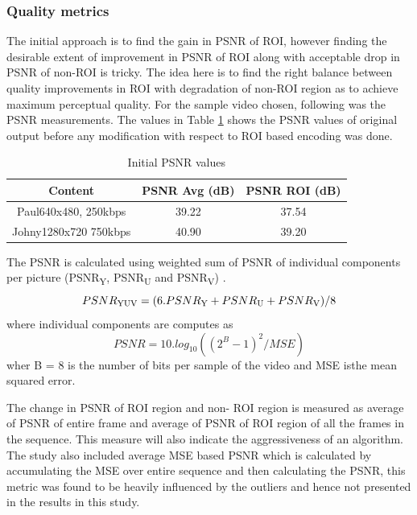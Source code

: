 \documentclass[11pt]{article} %
\begin{document}
\subsubsection{Quality metrics}
The initial approach is to find the gain in PSNR of ROI, however finding the desirable extent of improvement in PSNR of ROI along with acceptable drop in PSNR of non-ROI is tricky. The idea here is to find the right balance between quality improvements in ROI with degradation of non-ROI region as to achieve maximum perceptual quality. For the sample video chosen, following was the PSNR measurements. The values in Table \ref{InitPSNR1} shows the PSNR values of original output before any modification with respect to ROI based encoding was done.
\begin{table} [h!]
\centering
\begin{tabular}{ |c|c|c| }
 \hline
Content & PSNR Avg (dB) & PSNR ROI (dB) \\
 \hline 
 Paul640x480, 250kbps & 39.22 & 37.54 \\ 
 Johny1280x720 750kbps & 40.90 & 39.20 \\  
 \hline
\end{tabular}
 \caption{Initial PSNR values}
 \label{InitPSNR1}
\end{table}

The PSNR is calculated using weighted sum of PSNR of individual components per picture (PSNR\textsubscript{Y}, PSNR\textsubscript{U} and PSNR\textsubscript{V}) \cite{ComparingCodingEfficiency}.
\begin{equation}
\label{Eq:PSNR}
PSNR\textsubscript{YUV} = ( 6 . PSNR\textsubscript{Y} + PSNR\textsubscript{U} + PSNR\textsubscript{V}) / 8
\end{equation}
 where individual components are computes as
\begin{equation}
\label{Eq:PSNRDef}
PSNR = 10 . log_{10}((2^B - 1)^2 / MSE)
\end{equation}
wher B = 8 is the number of bits per sample of the video and MSE isthe mean squared error.

 The change in PSNR of ROI region and non- ROI region is measured as average of PSNR of entire frame and average of PSNR of ROI region of all the frames in the sequence. This measure will also indicate the aggressiveness of an algorithm. The study also included average MSE based PSNR which is calculated by accumulating the MSE over entire sequence and then calculating the PSNR, this metric was found to be heavily influenced by the outliers and hence not presented in the results in this study.
\end{document}
